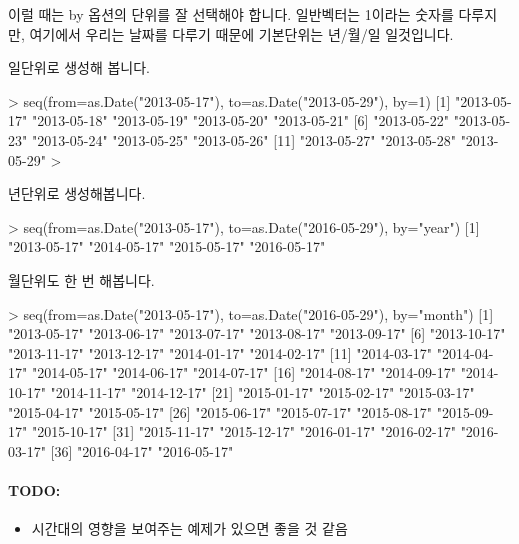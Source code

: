 이럴 때는 by 옵션의 단위를 잘 선택해야 합니다. 
일반벡터는 1이라는 숫자를 다루지만, 여기에서 우리는 날짜를 다루기 때문에 기본단위는 년/월/일 일것입니다.

일단위로 생성해 봅니다. 
\begin{Schunk}
\begin{Soutput} 
> seq(from=as.Date("2013-05-17"), to=as.Date("2013-05-29"), by=1)
 [1] "2013-05-17" "2013-05-18" "2013-05-19" "2013-05-20" "2013-05-21"
 [6] "2013-05-22" "2013-05-23" "2013-05-24" "2013-05-25" "2013-05-26"
[11] "2013-05-27" "2013-05-28" "2013-05-29"
> 
\end{Soutput}
\end{Schunk}


년단위로 생성해봅니다.
\begin{Schunk}
\begin{Soutput} 
> seq(from=as.Date("2013-05-17"), to=as.Date("2016-05-29"), by="year")
[1] "2013-05-17" "2014-05-17" "2015-05-17" "2016-05-17"
\end{Soutput}
\end{Schunk}


월단위도 한 번 해봅니다.
\begin{Schunk}
\begin{Soutput} 
> seq(from=as.Date("2013-05-17"), to=as.Date("2016-05-29"), by="month")
 [1] "2013-05-17" "2013-06-17" "2013-07-17" "2013-08-17" "2013-09-17"
 [6] "2013-10-17" "2013-11-17" "2013-12-17" "2014-01-17" "2014-02-17"
[11] "2014-03-17" "2014-04-17" "2014-05-17" "2014-06-17" "2014-07-17"
[16] "2014-08-17" "2014-09-17" "2014-10-17" "2014-11-17" "2014-12-17"
[21] "2015-01-17" "2015-02-17" "2015-03-17" "2015-04-17" "2015-05-17"
[26] "2015-06-17" "2015-07-17" "2015-08-17" "2015-09-17" "2015-10-17"
[31] "2015-11-17" "2015-12-17" "2016-01-17" "2016-02-17" "2016-03-17"
[36] "2016-04-17" "2016-05-17"
\end{Soutput}
\end{Schunk}




\paragraph{TODO:}
\begin{itemize}
	\item 시간대의 영향을 보여주는 예제가 있으면 좋을 것 같음
\end{itemize}


\begin{comment}



\end{comment}
